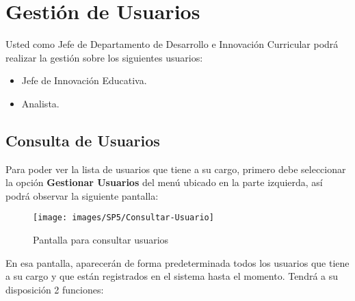 \chapter{Gestión de Usuarios}
    
    Usted como Jefe de Departamento de Desarrollo e Innovación Curricular podrá realizar la gestión sobre los siguientes usuarios:
    \begin{itemize}
        \item Jefe de Innovación Educativa.
        \item Analista.
    \end{itemize}
    

    \section{Consulta de Usuarios}
        
        Para poder ver la lista de usuarios que tiene a su cargo, primero debe seleccionar la opción \textbf{Gestionar Usuarios} del menú ubicado en la parte izquierda, así podrá observar la siguiente pantalla:
        
        \begin{figure}[!hbtp]
            \centering
            \hypertarget{consultarUs}{\texttt{[image: images/SP5/Consultar-Usuario]}}
            \caption{Pantalla para consultar usuarios}
            \label{consultarrh}
        \end{figure}
        
        En esa pantalla, aparecerán de forma predeterminada todos los usuarios que tiene a su cargo y que están registrados en el sistema hasta el momento. Tendrá a su disposición 2 funciones:
        
